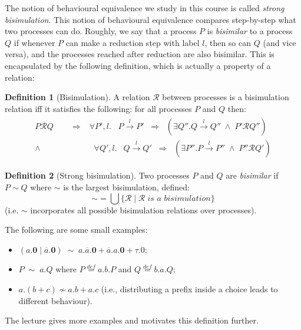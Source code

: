 \documentclass{article}
\theoremstyle{definition}
\newtheorem{definition}{Definition}
\begin{document}
The notion of behavioural equivalence we study in this course is
called \emph{strong bisimulation}. This notion of behavioural
equivalence compares step-by-step what two processes can do. Roughly,
we say that a process $P$ is \emph{bisimilar} to a process $Q$ if
whenever $P$ can make a reduction step with label $l$, then so can $Q$
(and vice versa), and the processes reached after reduction are also
bisimilar. This is encapsulated by the following definition, which is
actually a property of a relation:

\begin{definition}[Bisimulation]
  A relation $\mathcal{R}$ between processes is a bisimulation
  relation iff it satisfies the following: for all processes
  $P$ and $Q$ then:
  \begin{align*}
    \begin{array}{rl}
P \mathcal{R} Q \qquad \Rightarrow & \forall P', l . \;\;\; P \xrightarrow{l} P' \;\; \Rightarrow \;\;
      (\exists Q'' . Q \xrightarrow{l} Q'' \; \wedge \; P' \mathcal{R}
      Q'') \\
      \wedge & \;\; \forall Q', l . \;\:\; Q \xrightarrow{l} Q'  \;\; \Rightarrow \;\; (\exists P'' . P \xrightarrow{l} P'' \; \wedge \; P'' \mathcal{R} Q')
      \end{array}
  \end{align*}
\end{definition}
%
\begin{definition}[Strong bisimulation]
  Two processes $P$ and $Q$ are \emph{bisimilar} if $P \sim Q$
  where $\sim$ is the largest bisimulation, defined:
  \begin{equation*}
\sim = \bigcup \{\mathcal{R} \mid \mathcal{R} \; \textit{is a bisimulation} \}
  \end{equation*}
  (i.e. $\sim$ incorporates all possible bisimulation relations over processes).
\end{definition}
%
The following are some small examples:
%
\begin{itemize}
\item $(a.\mathbf{0} \mid \overline{a}.\mathbf{0})
\; \sim \; a.\overline{a}.\mathbf{0} + \overline{a}.a.\mathbf{0} +
\tau.0$;
\item $P \; \sim\;  a.Q$ where $P
{\mathrel{\mathop{=}\limits^{{def}}}} a.b.P$
and $Q {\mathrel{\mathop{=}\limits^{{def}}}} b.a.Q$;
\item $a.(b+c) \not\sim a.b + a.c$ (i.e., distributing
a prefix inside a choice leads to different behaviour).
\end{itemize}
%
The lecture gives more examples and motivates this definition further.
\end{document}
